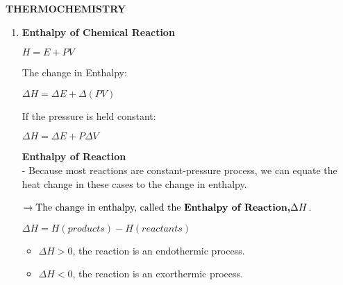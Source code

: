 \documentclass[10pt]{article}
\begin{document}
\begin{center}
	\textbf{THERMOCHEMISTRY}
\end{center}
\begin{enumerate}
	\item \textbf{Enthalpy of Chemical Reaction}\\
	\begin{mybox}
	\begin{center}
	$H = E + PV$
	\end{center}
	\end{mybox}
	The change in Enthalpy:
	\begin{mybox}
	\begin{center}
	$\Delta H = \Delta E + \Delta (PV)$
	\end{center}
	\end{mybox}
	If the pressure is held constant:
	\begin{center}
	$\Delta H = \Delta E + P \Delta V$
	\end{center}
	\textbf{Enthalpy of Reaction}\\
	- Because most reactions are constant-pressure process, we can equate the heat change in these cases to the change in enthalpy.
	\begin{center}
	\end{center}
	$\rightarrow{\mbox{The change in enthalpy, called the \textbf{Enthalpy of Reaction,$\Delta H$}}}$.\\
	\begin{mybox}
	\begin{center}
	$\Delta H = H(products) - H(reactants)$
	\end{center}
	\end{mybox}
	\begin{itemize}
		\item $\Delta H >0$, the reaction is an endothermic process.
		\item $\Delta H < 0$, the reaction is an exorthermic process.
	\end{itemize}	
\end{enumerate}
\end{document}
